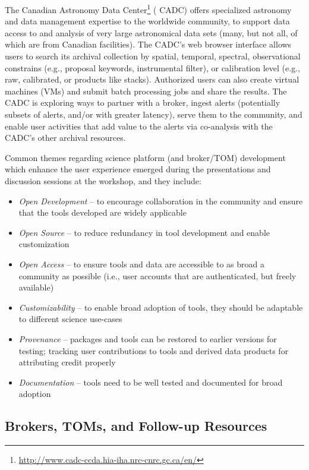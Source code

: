 The Canadian Astronomy Data  {Center}\footnote{\url{http://www.cadc-ccda.hia-iha.nrc-cnrc.gc.ca/en/}} ( {CADC}) offers specialized astronomy and data management expertise to the worldwide community, to support data access to and analysis of very large astronomical data sets (many, but not all, of which are from Canadian facilities).
The  {CADC}'s web browser interface allows users to search its archival collection by spatial, temporal, spectral, observational constrains (e.g., proposal keywords, instrumental filter), or  {calibration} level (e.g., raw, calibrated, or products like stacks).
Authorized users can also create virtual machines (VMs) and submit batch processing jobs and share the results.
The  {CADC} is exploring ways to partner with a broker, ingest alerts (potentially subsets of alerts, and/or with greater latency), serve them to the community, and enable user activities that add value to the alerts via co-analysis with the  {CADC}'s other archival resources.

Common themes regarding science platform (and broker/TOM) development which enhance the user experience emerged during the presentations and discussion sessions at the workshop, and they include:
\begin{itemize}
\item {\it Open Development} -- to encourage collaboration in the community and ensure that the tools developed are widely applicable
\item {\it Open  {Source}} -- to reduce redundancy in tool development and enable customization
\item {\it Open Access} -- to ensure tools and data are accessible to as broad a community as possible (i.e., user accounts that are authenticated, but freely available)
\item {\it Customizability} -- to enable broad adoption of tools, they should be adaptable to different science use-cases
\item {\it Provenance} -- packages and tools can be restored to earlier versions for testing; tracking user contributions to tools and derived data products for attributing credit properly
\item {\it Documentation} -- tools need to be well tested and documented for broad adoption
\end{itemize}

\subsection{Brokers, TOMs, and Follow-up Resources}\label{ssec:interfaces_brokers}

